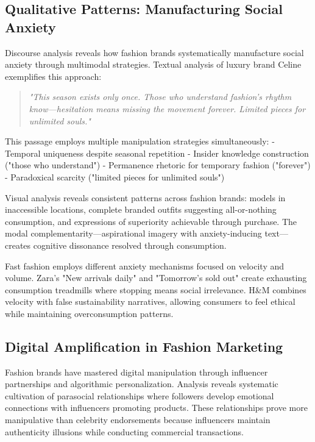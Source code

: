 \subsection{Qualitative Patterns: Manufacturing Social Anxiety}

Discourse analysis reveals how fashion brands systematically manufacture social anxiety through multimodal strategies. Textual analysis of luxury brand Celine exemplifies this approach:

\begin{quote}
\textit{"This season exists only once. Those who understand fashion's rhythm know—hesitation means missing the movement forever. Limited pieces for unlimited souls."}
\end{quote}

This passage employs multiple manipulation strategies simultaneously:
- Temporal uniqueness despite seasonal repetition
- Insider knowledge construction ("those who understand")
- Permanence rhetoric for temporary fashion ("forever")
- Paradoxical scarcity ("limited pieces for unlimited souls")

Visual analysis reveals consistent patterns across fashion brands: models in inaccessible locations, complete branded outfits suggesting all-or-nothing consumption, and expressions of superiority achievable through purchase. The modal complementarity—aspirational imagery with anxiety-inducing text—creates cognitive dissonance resolved through consumption.

Fast fashion employs different anxiety mechanisms focused on velocity and volume. Zara's "New arrivals daily" and "Tomorrow's sold out" create exhausting consumption treadmills where stopping means social irrelevance. H\&M combines velocity with false sustainability narratives, allowing consumers to feel ethical while maintaining overconsumption patterns.

\subsection{Digital Amplification in Fashion Marketing}

Fashion brands have mastered digital manipulation through influencer partnerships and algorithmic personalization. Analysis reveals systematic cultivation of parasocial relationships where followers develop emotional connections with influencers promoting products. These relationships prove more manipulative than celebrity endorsements because influencers maintain authenticity illusions while conducting commercial transactions.

